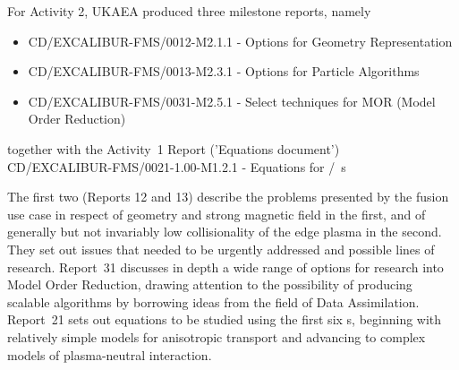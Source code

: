 For Activity 2, UKAEA produced three milestone reports, namely
\begin{itemize}
\item CD/EXCALIBUR-FMS/0012-M2.1.1  - Options for Geometry Representation 
\item CD/EXCALIBUR-FMS/0013-M2.3.1  - Options for Particle Algorithms
\item CD/EXCALIBUR-FMS/0031-M2.5.1  - Select techniques for MOR (Model Order Reduction)
\end{itemize}
together with the Activity~1 Report ('Equations document') \\
CD/EXCALIBUR-FMS/0021-1.00-M1.2.1 - Equations for \nep/\exc \  \papp s

The first two (Reports 12 and 13) describe the problems presented by the fusion use case
in respect of geometry and strong magnetic field in the first, and of generally but
not invariably low collisionality of the edge plasma in the second.  They set out issues
that needed to be urgently addressed and possible lines of research.
Report~31 discusses in depth a wide range of options for research into
Model Order Reduction, drawing attention to the possibility of producing scalable
algorithms by borrowing ideas from the field of Data Assimilation.
Report~21 sets out equations to be studied using the first six \papp s,
beginning with relatively simple models  for anisotropic transport and advancing to
complex models of plasma-neutral interaction. 


